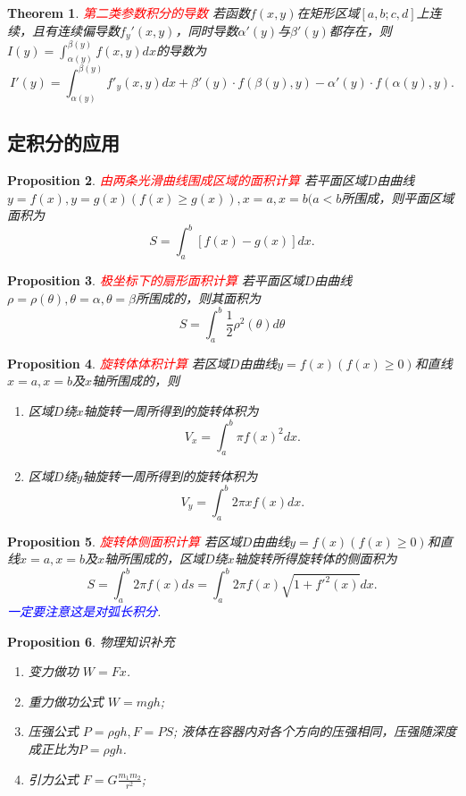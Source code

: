 \documentclass{article}
\newtheorem{theorem}{Theorem}[section]
\newtheorem{proposition}[theorem]{Proposition}
\newcommand{\redt}[1]{\textcolor{red}{#1}}
\newcommand{\bluet}[1]{\textcolor{blue}{#1}}
\begin{document}
\begin{theorem}
\rm \redt{第二类参数积分的导数} 若函数$f(x,y)$在矩形区域$[a,b;c,d]$上连续，且有连续偏导数$f_y'(x,y)$，同时导数$\alpha'(y)$与$\beta'(y)$都存在，则$I(y) = \int_{\alpha(y)}^{\beta(y)} f(x,y)dx$的导数为
$$
I'(y) = \int_{\alpha(y)}^{\beta(y)} f'_y(x,y)dx + \beta'(y)\cdot f(\beta(y),y)-\alpha'(y)\cdot f(\alpha(y),y). 
$$
\end{theorem}

\subsection{定积分的应用}

\begin{proposition}
\rm \redt{由两条光滑曲线围成区域的面积计算} 若平面区域$D$由曲线$y=f(x),y=g(x)(f(x)\geq g(x)),x=a,x=b(a < b$所围成，则平面区域面积为
$$
S = \int_a^b [f(x)-g(x)]dx.
$$
\end{proposition}

\begin{proposition}
\rm \redt{极坐标下的扇形面积计算} 若平面区域$D$由曲线$\rho=\rho(\theta), \theta=\alpha,\theta = \beta$所围成的，则其面积为
$$
S = \int_a^b \frac{1}{2}\rho^2(\theta)d\theta 
$$
\end{proposition}

\begin{proposition}
\rm \redt{旋转体体积计算} 若区域$D$由曲线$y=f(x)(f(x) \geq 0)$和直线$x=a,x=b$及$x$轴所围成的，则
\begin{enumerate}
	\item 区域$D$绕$x$轴旋转一周所得到的旋转体积为
	$$
	V_x = \int_{a}^b \pi f(x)^2dx.
	$$
	\item 区域$D$绕$y$轴旋转一周所得到的旋转体积为
	$$
	V_y = \int_{a}^b 2\pi xf(x)dx. 
	$$
\end{enumerate}
\end{proposition}

\begin{proposition}
\rm \redt{旋转体侧面积计算} 若区域$D$由曲线$y=f(x)(f(x) \geq 0)$和直线$x=a,x=b$及$x$轴所围成的，区域$D$绕$x$轴旋转所得旋转体的侧面积为
$$
S = \int_a^b 2\pi f(x)ds = \int_a^b 2\pi f(x) \sqrt{1+{f'}^2(x)}dx.
$$
\bluet{一定要注意这是对弧长积分}.
\end{proposition}


\begin{proposition}
\rm 物理知识补充
\begin{enumerate}
	\item 变力做功 $W=Fx$.
	\item 重力做功公式 $W=mgh$;
	\item 压强公式 $P = \rho gh, F = PS$; 液体在容器内对各个方向的压强相同，压强随深度成正比为$P = \rho gh$. 
	\item 引力公式 $F = G \frac{m_1m_2}{r^2}$;	
\end{enumerate}
\end{proposition}
\end{document}
